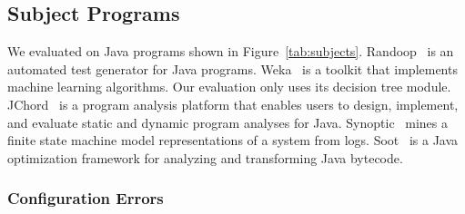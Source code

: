 

\subsection{Subject Programs}


We evaluated \ourtool on \subjectnum Java programs shown
in Figure~\ref{tab:subjects}.
Randoop~\cite{PachecoLET2007} is an automated test generator
for Java programs. Weka~\cite{wekaarticle} is a toolkit that implements
machine learning algorithms. Our evaluation
only uses its decision tree module. JChord~\cite{chordtutorial}
is a program analysis platform that enables users to design, implement,
and evaluate static and dynamic program analyses for Java.
Synoptic~\cite{Beschastnikh:2011} mines a finite state machine
model representations of a system from logs.
Soot~\cite{Vallee-Rai-1999} is a Java optimization framework for analyzing and transforming Java bytecode.


\subsubsection{Configuration Errors}

